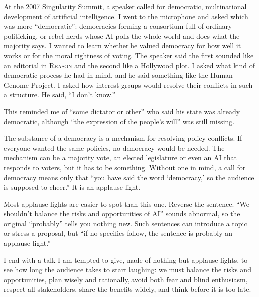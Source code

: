 
At the 2007 Singularity Summit, a speaker called for democratic, multinational development of artificial intelligence. I went to the microphone and asked which was more ``democratic'': democracies forming a consortium full of ordinary politicking, or rebel nerds whose AI polls the whole world and does what the majority says. I wanted to learn whether he valued democracy for how well it works or for the moral rightness of voting. The speaker said the first sounded like an editorial in \textsc{Reason} and the second like a Hollywood plot.  I asked what kind of democratic process he had in mind, and he said something like the Human Genome Project.  I asked how interest groups would resolve their conflicts in such a structure. He said, ``I don't know.'' 

This reminded me of ``some dictator or other'' who said his state was already democratic, although ``the expression of the people's will'' was still missing. 

The substance of a democracy is a mechanism for resolving policy conflicts. If everyone wanted the same policies, no democracy would be needed. The mechanism can be a majority vote, an elected legislature or even an AI that responds to voters, but it has to be something. Without one in mind, a call for democracy means only that ``you have said the word `democracy,' so the audience is supposed to cheer.'' It is an applause light. 

Most applause lights are easier to spot than this one. Reverse the sentence. ``We shouldn't balance the risks and opportunities of AI'' sounds abnormal, so the original ``probably'' tells you nothing new. Such sentences can introduce a topic or stress a proposal, but ``if no specifics follow, the sentence is probably an applause light.'' 

I end with a talk I am tempted to give, made of nothing but applause lights, to see how long the audience takes to start laughing: we must balance the risks and opportunities, plan wisely and rationally, avoid both fear and blind enthusiasm, respect all stakeholders, share the benefits widely, and think before it is too late.
